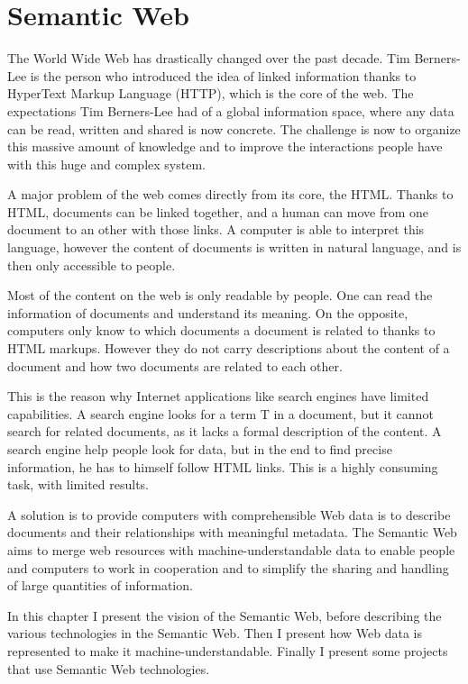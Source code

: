 \chapter{Semantic Web}{
The World Wide Web has drastically changed over the past decade. Tim
Berners-Lee is the person who introduced the idea of linked information thanks
to HyperText Markup Language (HTTP), which is the core of the web. The
expectations Tim Berners-Lee had of a global information space, where any data
can be read, written and shared is now concrete. The challenge is now to
organize this massive amount of knowledge and to improve the interactions
people have with this huge and complex system.

A major problem of the web comes directly from its core, the HTML. Thanks to
HTML, documents can be linked together, and a human can move from one document
to an other with those links. A computer is able to interpret this language,
however the content of documents is written in natural language, and is then
only accessible to people.

Most of the content on the web is only readable by people. One can read the
information of documents and understand its meaning. On the opposite, computers
only know to which documents a document is related to thanks to HTML markups.
However they do not carry descriptions about the content of a document and how
two documents are related to each other.

This is the reason why Internet applications like search engines have limited
capabilities. A search engine looks for a term T in a document, but it cannot
search for related documents, as it lacks a formal description of the content.
A search engine help people look for data, but in the end to find precise
information, he has to himself follow HTML links. This is a highly consuming
task, with limited results.

A solution is to provide computers with comprehensible Web data is to describe
documents and their relationships with meaningful metadata. The Semantic
Web aims to merge web resources with machine-understandable data to enable
people and computers to work in cooperation and to simplify the sharing and
handling of large quantities of information.

In this chapter I present the vision of the Semantic Web, before describing the
various technologies in the Semantic Web. Then I present how Web data is
represented to make it machine-understandable. Finally I present some projects
that use Semantic Web technologies.
}
\label{chap:SW}


